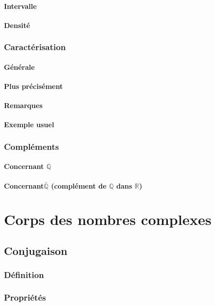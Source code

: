 \documentclass[12pt,a4paper,french]{book}
\begin{document}
			\subsubsection{Intervalle}
			\subsubsection{Densité}
		\subsection{Caractérisation}
			\subsubsection{Générale}
			\subsubsection{Plus précisément}
			\subsubsection{Remarques}
			\subsubsection{Exemple usuel}
		\subsection{Compléments}
			\subsubsection{Concernant $\mathbb{Q}$}
			\subsubsection{Concernant$\bar{\mathbb{Q}}$ (complément de $\mathbb{Q}$ dans $\mathbb{R}$)}
			
			
\chapter{Corps des nombres complexes}
	\section{Conjugaison}
		\subsection{Définition}
		\subsection{Propriétés}
\end{document}
